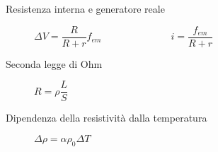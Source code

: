 \documentclass[a4paper,11pt,italian]{article}
\begin{document}
\begin{description}
  \item[Resistenza interna e generatore reale] 
%   
  $ \Delta V = \dfrac{R}{R+r} f_{em} $~~~~~~~~~~~~~~$ i = \dfrac{f_{em}}{R+r} $
  
  \item[Seconda legge di Ohm] 
  $ R = \rho \dfrac{L}{S} $
  
  \item[Dipendenza della resistività dalla temperatura]
  $ \Delta \rho = \alpha \rho_0 \Delta T  $
  
  
%   
  

\end{description}
\end{document}
